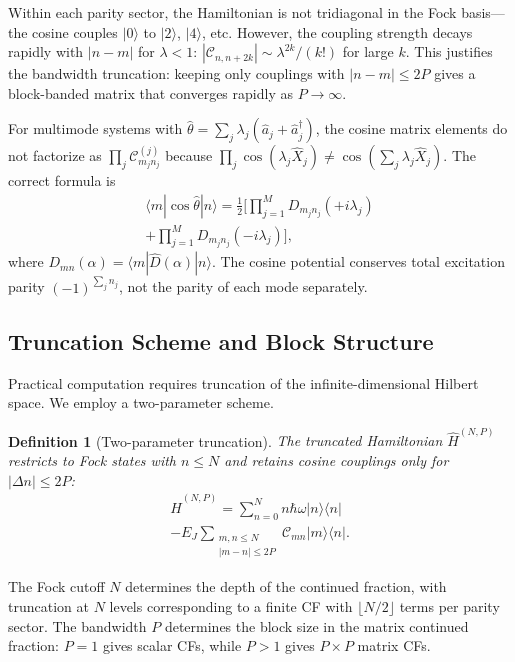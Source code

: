 \documentclass[reprint, floatfix, superscriptaddress, amsmath, amssymb, longbibliography]{revtex4-2}
\newtheorem{definition}[theorem]{Definition}
\begin{document}
Within each parity sector, the Hamiltonian is not tridiagonal in the Fock basis---the cosine couples $|0\rangle$ to $|2\rangle$, $|4\rangle$, etc. However, the coupling strength decays rapidly with $|n-m|$ for $\lambda < 1$: $|\mathcal{C}_{n,n+2k}| \sim \lambda^{2k}/(k!)$ for large $k$. This justifies the bandwidth truncation: keeping only couplings with $|n-m| \leq 2P$ gives a block-banded matrix that converges rapidly as $P \to \infty$.

For multimode systems with $\hat{\theta} = \sum_j \lambda_j (\hat{a}_j + \hat{a}_j^\dagger)$, the cosine matrix elements do not factorize as $\prod_j \mathcal{C}_{m_j n_j}^{(j)}$ because $\prod_j \cos(\lambda_j \hat{X}_j) \neq \cos(\sum_j \lambda_j \hat{X}_j)$. The correct formula is
\begin{multline}
\langle {m} | \cos\hat{\theta} | {n} \rangle = \frac{1}{2} \biggl[ \prod_{j=1}^{M} D_{m_j n_j}(+i\lambda_j) \\
+ \prod_{j=1}^{M} D_{m_j n_j}(-i\lambda_j) \biggr],
\label{eq:multimode_cosine_correct}
\end{multline}
where $D_{mn}(\alpha) = \langle m | \hat{D}(\alpha) | n \rangle$. The cosine potential conserves total excitation parity $(-1)^{\sum_j n_j}$, not the parity of each mode separately.

\subsection{Truncation Scheme and Block Structure}
\label{sec:truncation}

Practical computation requires truncation of the infinite-dimensional Hilbert space. We employ a two-parameter scheme.

\begin{definition}[Two-parameter truncation]
The truncated Hamiltonian $\hat{H}^{(N,P)}$ restricts to Fock states with $n \le N$ and retains cosine couplings only for $|\Delta n| \le 2P$:
\begin{multline}
\hat{H}^{(N,P)} = \sum_{n=0}^{N} n\hbar\omega |n\rangle\langle n| \\
- E_J \sum_{\substack{m,n \le N \\ |m-n| \le 2P}} \mathcal{C}_{mn} |m\rangle\langle n|.
\label{eq:H_NP}
\end{multline}
\end{definition}

The Fock cutoff $N$ determines the depth of the continued fraction, with truncation at $N$ levels corresponding to a finite CF with $\lfloor N/2 \rfloor$ terms per parity sector. The bandwidth $P$ determines the block size in the matrix continued fraction: $P=1$ gives scalar CFs, while $P > 1$ gives $P \times P$ matrix CFs.
\end{document}
